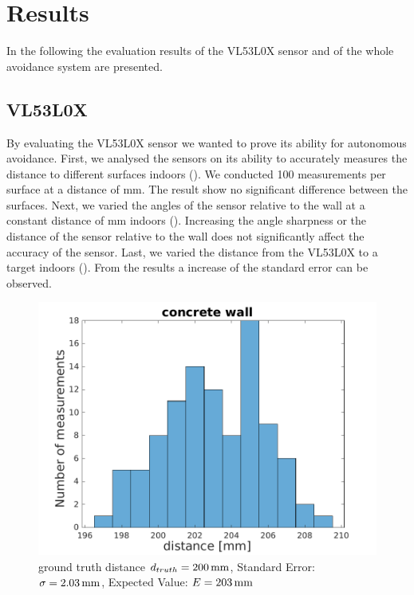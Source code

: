 \chapter{Results}
In the following the evaluation results of the VL53L0X sensor and of the whole avoidance system are presented. 
\section{VL53L0X}
By evaluating the VL53L0X sensor we wanted to prove its ability for autonomous avoidance. 
First, we analysed the sensors on its ability to accurately measures the distance to different surfaces indoors (). We conducted 100 measurements per surface at a distance of \unit[200]{mm}. The result show no significant difference between the surfaces. Next, we varied the angles of the sensor relative to the wall at a constant distance of \unit[200]{mm} indoors (). Increasing the angle sharpness or the distance of the sensor relative to the wall does not significantly affect the accuracy of the sensor. Last, we varied the distance from the VL53L0X to a target indoors (). From the results a increase of the standard error can be observed.\\


\begin{figure}
		\centering
		\includegraphics[width=0.9\linewidth]{pictures/concrete_hist.pdf}
		\caption{ground truth distance $d_{truth}= \unit[200]{mm}$, Standard Error: $\sigma=\unit[2.03]{mm}$, Expected Value: $E=\unit[203]{mm}$}
		\label{fig:surface_hist_con}
\end{figure}

